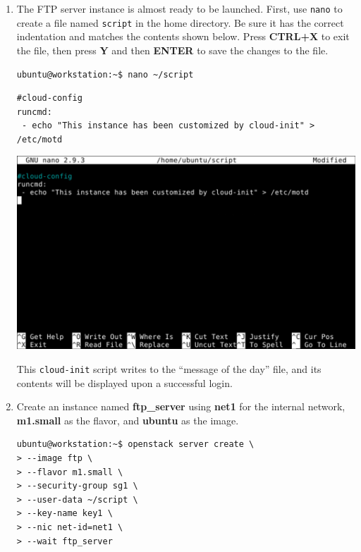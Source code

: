 \documentclass[letterpaper, 12pt]{article}
\begin{document}
\begin{enumerate}
    \item The FTP server instance is almost ready to be launched. First, use \texttt{nano} to create a file named
    \texttt{script} in the home directory. Be sure it has the correct indentation and matches the contents shown below.
    Press \textbf{CTRL+X} to exit the file, then press \textbf{Y} and then \textbf{ENTER} to save the changes to the
    file.
\begin{lstlisting}
ubuntu@workstation:~$ nano ~/script
\end{lstlisting}
\begin{lstlisting}
#cloud-config
runcmd:
 - echo "This instance has been customized by cloud-init" > /etc/motd
\end{lstlisting}

    \begin{center}
        \includegraphics[width=\linewidth]{images/part1/step34.png}
    \end{center}

    \begin{notebox}
        This \texttt{cloud-init} script writes to the ``message of the day'' file, and its contents will be displayed
        upon a successful login.
    \end{notebox}

    \item Create an instance named \textbf{ftp\_server} using \textbf{net1} for the internal network, \textbf{m1.small}
    as the flavor, and \textbf{ubuntu} as the image.
\begin{lstlisting}
ubuntu@workstation:~$ openstack server create \
> --image ftp \
> --flavor m1.small \
> --security-group sg1 \
> --user-data ~/script \
> --key-name key1 \
> --nic net-id=net1 \
> --wait ftp_server
\end{lstlisting}


\end{enumerate}
\end{document}
